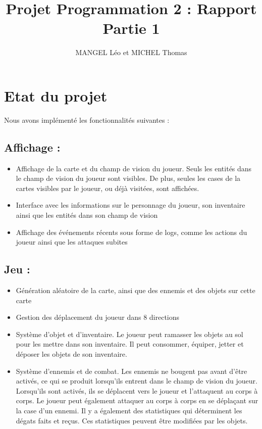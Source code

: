 \documentclass[10pt,a4paper]{article}
\title{Projet Programmation 2 : Rapport Partie 1}
\author{MANGEL Léo et MICHEL Thomas}
\date{}
\begin{document}
\maketitle

\section{Etat du projet}

Nous avons implémenté les fonctionnalités suivantes : 

\subsection*{Affichage :}

\begin{itemize}
	\item Affichage de la carte et du champ de vision du joueur. Seuls les entités dans le champ de vision du joueur sont visibles. De plus, seules les cases de la cartes visibles par le joueur, ou déjà visitées, sont affichées.
	\item Interface avec les informations sur le personnage du joueur, son inventaire ainsi que les entités dans son champ de vision
	\item Affichage des événements récents sous forme de logs, comme les actions du joueur ainsi que les attaques subites
\end{itemize}

\subsection*{Jeu :}

\begin{itemize}
	\item Génération aléatoire de la carte, ainsi que des ennemis et des objets sur cette carte
	\item Gestion des déplacement du joueur dans 8 directions
	\item Système d'objet et d'inventaire. Le joueur peut ramasser les objets au sol pour les mettre dans son inventaire. Il peut consommer, équiper, jetter et déposer les objets de son inventaire.
	\item Système d'ennemis et de combat. Les ennemis ne bougent pas avant d'être activés, ce qui se produit lorsqu'ils entrent dans le champ de vision du joueur. Lorsqu'ils sont activés, ils se déplacent vers le joueur et l'attaquent au corps à corps. Le joueur peut également attaquer au corps à corps en se déplaçant sur la case d'un ennemi. Il y a également des statistiques qui déterminent les dégats faits et reçus. Ces statistiques peuvent être modifiées par les objets.
\end{itemize}
\end{document}
